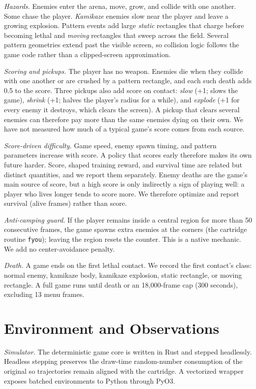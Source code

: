 \documentclass[journal]{IEEEtran}
\begin{document}
\textit{Hazards.} Enemies enter the arena, move, grow, and collide with one another. Some chase the player. \emph{Kamikaze} enemies slow near the player and leave a growing explosion. Pattern events add large \emph{static} rectangles that charge before becoming lethal and \emph{moving} rectangles that sweep across the field. Several pattern geometries extend past the visible screen, so collision logic follows the game code rather than a clipped-screen approximation.

\textit{Scoring and pickups.} The player has no weapon. Enemies die when they collide with one another or are crushed by a pattern rectangle, and each such death adds 0.5 to the score. Three pickups also add score on contact: \emph{slow} (+1; slows the game), \emph{shrink} (+1; halves the player's radius for a while), and \emph{explode} (+1 for every enemy it destroys, which clears the screen). A pickup that clears several enemies can therefore pay more than the same enemies dying on their own. We have not measured how much of a typical game's score comes from each source.

\textit{Score-driven difficulty.} Game speed, enemy spawn timing, and pattern parameters increase with score. A policy that scores early therefore makes its own future harder. Score, shaped training reward, and survival time are related but distinct quantities, and we report them separately. Enemy deaths are the game's main source of score, but a high score is only indirectly a sign of playing well: a player who lives longer tends to score more. We therefore optimize and report survival (alive frames) rather than score.

\textit{Anti-camping guard.} If the player remains inside a central region for more than 50 consecutive frames, the game spawns extra enemies at the corners (the cartridge routine \texttt{fyou}); leaving the region resets the counter. This is a native mechanic. We add no center-avoidance penalty.

\textit{Death.} A game ends on the first lethal contact. We record the first contact's class: normal enemy, kamikaze body, kamikaze explosion, static rectangle, or moving rectangle. A full game runs until death or an 18{,}000-frame cap (300 seconds), excluding 13 menu frames.

\section{Environment and Observations}\label{sec:env}
\textit{Simulator.} The deterministic game core is written in Rust and stepped headlessly. Headless stepping preserves the draw-time random-number consumption of the original so trajectories remain aligned with the cartridge. A vectorized wrapper exposes batched environments to Python through PyO3.
\end{document}
